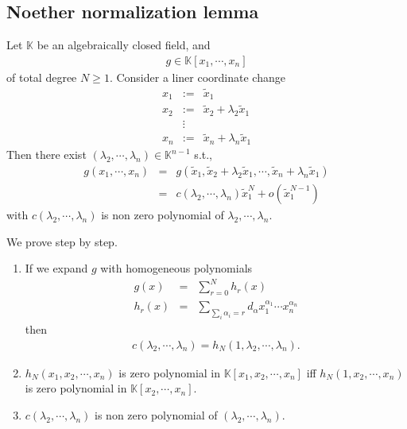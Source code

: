 \documentclass[11pt]{book}
\begin{document}
\subsection{Noether normalization lemma}
\label{NoetherNormalizationLemma}
Let $\mathbb{K}$ be an algebraically closed field, and
\begin{eqnarray}
g \in \mathbb{K}[x_1, \cdots, x_n]
\end{eqnarray}
of total degree $N \geq 1$.
Consider a liner coordinate change
\begin{eqnarray}
x_1 &:=& \tilde{x}_1 \\
x_2 &:=& \tilde{x}_2 + \lambda_2 \tilde{x}_1 \\
&\vdots& \\
x_n &:=& \tilde{x}_n + \lambda_n \tilde{x}_1 
\end{eqnarray}
Then there exist $(\lambda_2, \cdots, \lambda_n) \in \mathbb{K}^{n-1}$ s.t.,
\begin{eqnarray}
g(x_1, \cdots, x_n) &=& g(\tilde{x}_1,\tilde{x}_2 + \lambda_2 \tilde{x}_1, \cdots,  \tilde{x}_n + \lambda_n \tilde{x}_1 ) \\
&=& c(\lambda_2, \cdots, \lambda_n) \tilde{x}_1^{N} + o( \tilde{x}_1^{N-1} )
\end{eqnarray}
with $c(\lambda_2, \cdots, \lambda_n)$ is non zero polynomial of $\lambda_2, \cdots, \lambda_n$. 

We prove step by step.
\begin{enumerate}
\item If we expand $g$ with homogeneous polynomials
\begin{eqnarray}
g(x) &=& \sum_{r=0}^N h_r(x) \\
h_r(x) &=& \sum_{\sum_i \alpha_i = r} d_{\alpha} x_1^{\alpha_1} \cdots x_n^{\alpha_n} 
\end{eqnarray}
then
\begin{eqnarray}
c(\lambda_2, \cdots, \lambda_n) = h_N(1, \lambda_2, \cdots, \lambda_n).
\end{eqnarray}

\item
$h_N(x_1, x_2, \cdots, x_n)$ is zero polynomial in $\mathbb{K}[x_1, x_2, \cdots, x_n]$ iff $h_N(1, x_2, \cdots, x_n)$ is zero polynomial in $\mathbb{K}[x_2, \cdots, x_n]$.

\item
$c(\lambda_2, \cdots, \lambda_n)$ is non zero polynomial of $(\lambda_2, \cdots, \lambda_n)$.

\end{enumerate}
\end{document}
